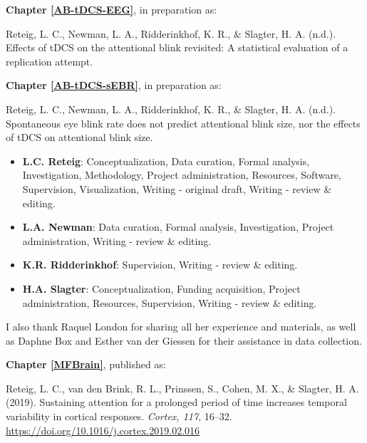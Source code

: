 \documentclass[11pt,]{memoir}
\providecommand{\tightlist}{%
  \setlength{\itemsep}{0pt}\setlength{\parskip}{0pt}}
\begin{document}
\textbf{Chapter \ref{AB-tDCS-EEG}}, in preparation as:

Reteig, L. C., Newman, L. A., Ridderinkhof, K. R., \& Slagter, H. A. (n.d.). Effects of tDCS on the attentional blink revisited: A statistical evaluation of a replication attempt.

\textbf{Chapter \ref{AB-tDCS-sEBR}}, in preparation as:

Reteig, L. C., Newman, L. A., Ridderinkhof, K. R., \& Slagter, H. A. (n.d.). Spontaneous eye blink rate does not predict attentional blink size, nor the effects of tDCS on attentional blink size.

\begin{itemize}
\tightlist
\item
  \textbf{L.C. Reteig}: Conceptualization, Data curation, Formal analysis, Investigation, Methodology, Project administration, Resources, Software, Supervision, Visualization, Writing - original draft, Writing - review \& editing.
\item
  \textbf{L.A. Newman}: Data curation, Formal analysis, Investigation, Project administration, Writing - review \& editing.
\item
  \textbf{K.R. Ridderinkhof}: Supervision, Writing - review \& editing.
\item
  \textbf{H.A. Slagter}: Conceptualization, Funding acquisition, Project administration, Resources, Supervision, Writing - review \& editing.
\end{itemize}

\begin{list}{}{\leftmargin=1.5em\rightmargin=0pt}
\item
I also thank Raquel London for sharing all her experience and materials, as well as Daphne Box and Esther van der Giessen for their assistance in data collection.\newline
\end{list}

\textbf{Chapter \ref{MFBrain}}, published as:

Reteig, L. C., van den Brink, R. L., Prinssen, S., Cohen, M. X., \& Slagter, H. A. (2019). Sustaining attention for a prolonged period of time increases temporal variability in cortical responses. \emph{Cortex, 117}, 16--32. \url{https://doi.org/10.1016/j.cortex.2019.02.016}
\end{document}
